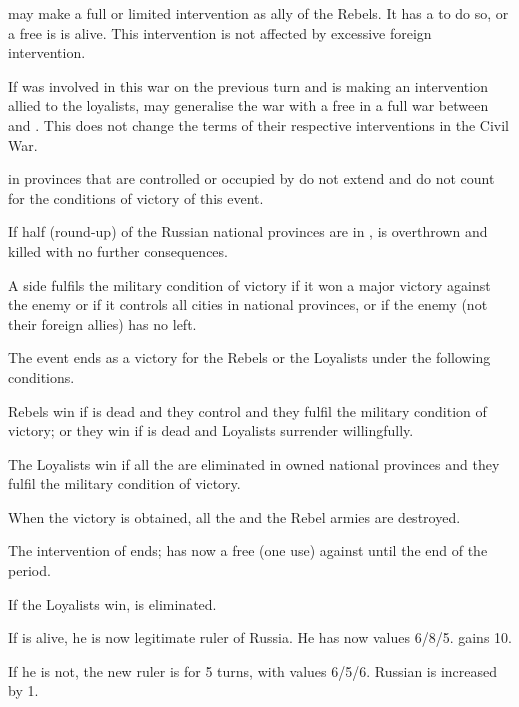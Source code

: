 \phdipl

\aparag \POL may make a full or limited intervention as ally of the Rebels. It
has a \CB to do so, or a free \CB is \leaderDmitry is alive. This
intervention is not affected by excessive foreign intervention.

\aparag If \POL was involved in this war on the previous turn and \SUE is
making an intervention allied to the loyalists, \POL may generalise the war
with a free \CB in a full war between \SUE and \POL. This does not change the
terms of their respective interventions in the Civil War.

\phpaix

\aparag \REVOLT in provinces that are controlled or occupied by \POL do not
extend and do not count for the conditions of victory of this event.

\aparag If half (round-up) of the Russian national provinces are in \REVOLT ,
 is overthrown and killed with no further
consequences.


\aparag A side fulfils the military condition of victory if it won a major
victory against the enemy or if it controls all cities in national provinces,
or if the enemy (not their foreign allies) has no \ARMY left.

\aparag The event ends as a victory for the Rebels or the Loyalists under the
following conditions.

\bparag Rebels win if  is dead and they control
\villeMoscou and they fulfil the military condition of victory; or they win if
 is dead and Loyalists surrender willingfully.

\bparag The Loyalists win if all the \REVOLT are eliminated in owned national
provinces and they fulfil the military condition of victory.

\bparag When the victory is obtained, all the \REVOLT and the Rebel armies are
destroyed.

\bparag The intervention of \SUE ends; \RUS has now a free \CB (one use)
against \SUE until the end of the period.

\aparag If the Loyalists win, \leaderDmitry is eliminated.

\bparag If  is alive, he is now legitimate ruler of
Russia. He has now values 6/8/5.  \RUS gains 10\PV.

\bparag If he is not, the new ruler is \monarqueRomanov for 5 turns, with
values 6/5/6. Russian \STAB is increased by 1.

